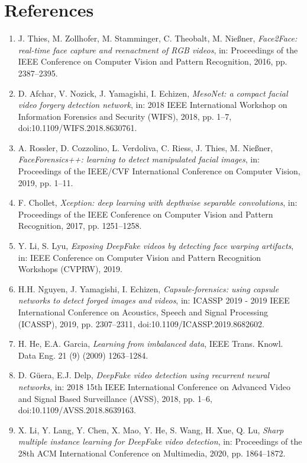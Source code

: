 
\section{References}

\begin{enumerate}
    \item J. Thies, M. Zollhofer, M. Stamminger, C. Theobalt, M. Nießner, \textit{Face2Face: real-time face capture and reenactment of RGB videos}, in: Proceedings of the IEEE Conference on Computer Vision and Pattern Recognition, 2016, pp. 2387–2395.
    
    \item D. Afchar, V. Nozick, J. Yamagishi, I. Echizen, \textit{MesoNet: a compact facial video forgery detection network}, in: 2018 IEEE International Workshop on Information Forensics and Security (WIFS), 2018, pp. 1–7, doi:10.1109/WIFS.2018.8630761.
    
    \item A. Rossler, D. Cozzolino, L. Verdoliva, C. Riess, J. Thies, M. Nießner, \textit{FaceForensics++: learning to detect manipulated facial images}, in: Proceedings of the IEEE/CVF International Conference on Computer Vision, 2019, pp. 1–11.
    
    \item F. Chollet, \textit{Xception: deep learning with depthwise separable convolutions}, in: Proceedings of the IEEE Conference on Computer Vision and Pattern Recognition, 2017, pp. 1251–1258.
    
    \item Y. Li, S. Lyu, \textit{Exposing DeepFake videos by detecting face warping artifacts}, in: IEEE Conference on Computer Vision and Pattern Recognition Workshops (CVPRW), 2019.
    
    \item H.H. Nguyen, J. Yamagishi, I. Echizen, \textit{Capsule-forensics: using capsule networks to detect forged images and videos}, in: ICASSP 2019 - 2019 IEEE International Conference on Acoustics, Speech and Signal Processing (ICASSP), 2019, pp. 2307–2311, doi:10.1109/ICASSP.2019.8682602.
    
    \item H. He, E.A. Garcia, \textit{Learning from imbalanced data}, IEEE Trans. Knowl. Data Eng. 21 (9) (2009) 1263–1284.
    
    \item D. Güera, E.J. Delp, \textit{DeepFake video detection using recurrent neural networks}, in: 2018 15th IEEE International Conference on Advanced Video and Signal Based Surveillance (AVSS), 2018, pp. 1–6, doi:10.1109/AVSS.2018.8639163.
    
    \item X. Li, Y. Lang, Y. Chen, X. Mao, Y. He, S. Wang, H. Xue, Q. Lu, \textit{Sharp multiple instance learning for DeepFake video detection}, in: Proceedings of the 28th ACM International Conference on Multimedia, 2020, pp. 1864–1872.
\end{enumerate}



